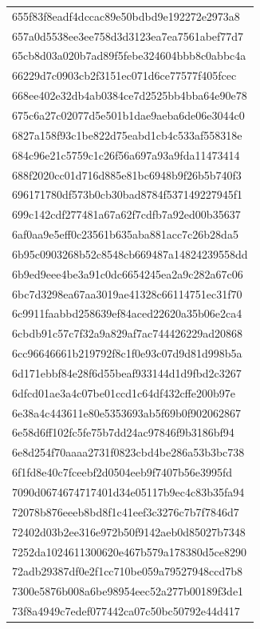 \begin{tabular}{l}
655f83f8eadf4dccac89e50bdbd9e192272e2973a8 \\
657a0d5538ee3ee758d3d3123ea7ea7561abef77d7 \\
65cb8d03a020b7ad89f5febe324604bbb8c0abbc4a \\
66229d7c0903cb2f3151ec071d6ce77577f405fcec \\
668ee402e32db4ab0384ce7d2525bb4bba64e90e78 \\
675c6a27c02077d5e501b1dae9aeba6de06e3044c0 \\
6827a158f93c1be822d75eabd1cb4c533af558318e \\
684c96e21c5759c1c26f56a697a93a9fda11473414 \\
688f2020cc01d716d885e81bc6948b9f26b5b740f3 \\
696171780df573b0cb30bad8784f537149227945f1 \\
699c142cdf277481a67a62f7cdfb7a92ed00b35637 \\
6af0aa9e5eff0c23561b635aba881acc7c26b28da5 \\
6b95c0903268b52c8548cb669487a14824239558dd \\
6b9ed9eee4be3a91c0dc6654245ea2a9c282a67c06 \\
6bc7d3298ea67aa3019ae41328c66114751ec31f70 \\
6c9911faabbd258639ef84aced22620a35b06e2ca4 \\
6cbdb91c57c7f32a9a829af7ac744426229ad20868 \\
6cc96646661b219792f8c1f0e93c07d9d81d998b5a \\
6d171ebbf84e28f6d55beaf933144d1d9fbd2c3267 \\
6dfcd01ae3a4c07be01ccd1c64df432cffe200b97e \\
6e38a4c443611e80e5353693ab5f69b0f902062867 \\
6e58d6ff102fc5fe75b7dd24ac97846f9b3186bf94 \\
6e8d254f70aaaa2731f0823cbd4be286a53b3bc738 \\
6f1fd8e40c7fceebf2d0504eeb9f7407b56e3995fd \\
7090d0674674717401d34e05117b9ec4c83b35fa94 \\
72078b876eeeb8bd8f1c41eef3c3276c7b7f7846d7 \\
72402d03b2ee316e972b50f9142aeb0d85027b7348 \\
7252da1024611300620e467b579a178380d5ce8290 \\
72adb29387df0e2f1cc710be059a79527948ccd7b8 \\
7300e5876b008a6be98954eec52a277b00189f3de1 \\
73f8a4949c7edef077442ca07c50bc50792e44d417 \\

\end{tabular}

